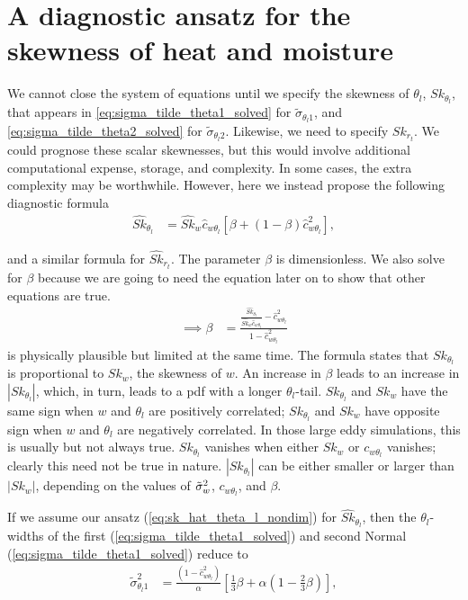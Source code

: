 \section{A diagnostic ansatz for the skewness of heat and moisture}\label{sec:diag_ansatz}

We cannot close the system of equations until we specify the skewness of $\theta_l$, $Sk_{\theta_l}$, that appears in \cref{eq:sigma_tilde_theta1_solved} for $\tilde{\sigma}_{\theta_l 1}$, and \cref{eq:sigma_tilde_theta2_solved} for $\tilde{\sigma}_{\theta_l 2}$.
Likewise, we need to specify $Sk_{r_t}$.
We could prognose these scalar skewnesses, but this would involve additional computational expense, storage, and complexity.
In some cases, the extra complexity may be worthwhile.
However, here we instead propose the following diagnostic formula
\begin{align}
    \label{eq:Sk_hat_thl_beta}
    \widehat{Sk}_{\theta_l}
    &= \widehat{Sk}_w \widehat{c}_{w \theta_l} \left[\beta + (1-\beta) \widehat{c}_{w \theta_l}^2 \right],
\end{align}

and a similar formula for $\widehat{Sk}_{r_t}$.
The parameter $\beta$ is dimensionless.
We also solve for $\beta$ because we are going to need the equation later on to show that other equations are true.
\begin{align}
    \label{eq:beta}
    \implies \beta
    &=\frac{\frac{\widehat{Sk}_{\theta_l}}{\widehat{Sk}_w \widehat{c}_{w \theta_l}} - \widehat{c}_{w \theta_l}^2}{1 - \widehat{c}_{w \theta_l}^2}
\end{align}
 is physically plausible but limited at the same time.
The formula states that $Sk_{\theta_l}$ is proportional to $Sk_w$, the skewness of $w$.
An increase in $\beta$ leads to an increase in $\left| Sk_{\theta_l} \right|$, which, in turn, leads to a \gls{pdf} with a longer $\theta_l$-tail.
$Sk_{\theta_l}$ and $Sk_w$ have the same sign when $w$ and $\theta_l$ are positively correlated;
$Sk_{\theta_l}$ and $Sk_w$ have opposite sign when $w$ and $\theta_l$ are negatively correlated.
In those large eddy simulations, this is usually but not always true.
$Sk_{\theta_l}$ vanishes when either $Sk_w$ or $c_{w \theta_l}$ vanishes;
clearly this need not be true in nature.
$\left| Sk_{\theta_l} \right|$ can be either smaller or larger than $\left| Sk_w \right|$, depending on the values of ${\tilde{\sigma}_w}^2$, $c_{w \theta_l}$, and $\beta$.

If we assume our ansatz (\cref{eq:sk_hat_theta_l_nondim}) for $\widehat{Sk}_{\theta_l}$, then the $\theta_l$-widths of the first (\cref{eq:sigma_tilde_theta1_solved}) and second Normal (\cref{eq:sigma_tilde_theta1_solved}) reduce to
\begin{align}
    \label{eq:sigma_theta1_beta}
    \tilde{\sigma}_{\theta_l 1}^2
    &= \frac{\left(1 - \widehat{c}_{w \theta_l}^2\right)}{\alpha} \left[\frac{1}{3} \beta + \alpha \left(1 - \frac{2}{3} \beta\right)\right],
\end{align}

